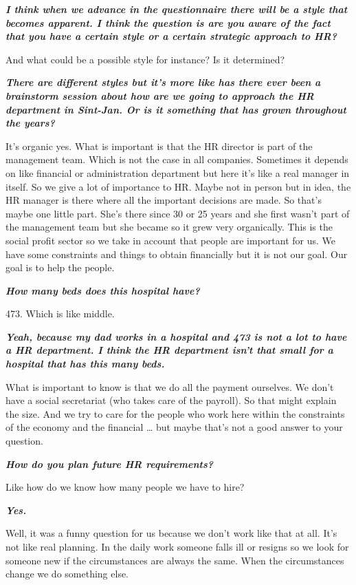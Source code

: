 \documentclass[a4paper,fleqn,11pt,dvips,titlepage]{article}
\newcommand{\question}[1]{\textbf{\textit{#1}}}
\numberwithin{figure}{section}
\numberwithin{equation}{section}
\begin{document}
\question{I think when we advance in the questionnaire there will be a style that becomes apparent. I think the question is are you aware of the fact that you have a certain style or a certain strategic approach to HR?}

And what could be a possible style for instance? Is it determined? 

\question{There are different styles but it’s more like has there ever been a brainstorm session about how are we going to approach the HR department in Sint-Jan. Or is it something that has grown throughout the years?}

It’s organic yes. What is important is that the HR director is part of the management team. Which is not the case in all companies. Sometimes it depends on like financial or administration department but here it’s like a real manager in itself. So we give a lot of importance to HR. Maybe not in person but in idea, the HR manager is there where all the important decisions are made. So that’s maybe one little part. She’s there since 30 or 25 years and she first wasn’t part of the management team but she became so it grew very organically. This is the social profit sector so we take in account that people are important for us. We have some constraints and things to obtain financially but it is not our goal. Our goal is to help the people.  

\question{How many beds does this hospital have?}

473. Which is like middle. 

\question{Yeah, because my dad works in a hospital and 473 is not a lot to have a HR department. I think the HR department isn’t that small for a hospital that has this many beds.}

What is important to know is that we do all the payment ourselves. We don’t have a social secretariat (who takes care of the payroll). So that might explain the size. And we try to care for the people who work here within the constraints of the economy and the financial … but maybe that’s not a good answer to your question. 

\question{How do you plan future HR requirements?}

Like how do we know how many people we have to hire? 

\question{Yes.}

Well, it was a funny question for us because we don’t work like that at all. It’s not like real planning. In the daily work someone falls ill or resigns so we look for someone new if the circumstances are always the same. When the circumstances change we do something else. 
\end{document}
